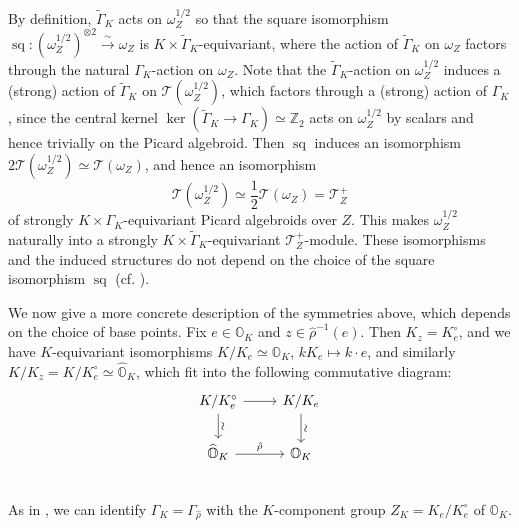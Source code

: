 \documentclass[11pt, a4paper]{amsart}
\newcommand*{\isoarrow}[1]{\arrow[#1,"\rotatebox{90}{\(\sim\)}"]}
\newcommand{\orb}{\mathbb{O}}
\newcommand{\orbk}{\orb_{K}}
\newcommand{\horbk}{\widehat{\orb}_{K}}
\newcommand{\Z}{\mathbb{Z}}
\newcommand{\tGamma}{\widetilde{\Gamma}}
\DeclareMathOperator{\sq}{sq}
\newcommand{\smallhalf}{{\scriptscriptstyle 1/2}}
\newcommand{\TT}{\mathscr{T}}
\theoremstyle{definition}
\numberwithin{equation}{section}
\begin{document}
By definition, $\tGamma_K$ acts on $\omega_Z^{\smallhalf}$ so that the square isomorphism $\sq: (\omega_Z^{\smallhalf})^{\otimes 2} \xrightarrow{\sim} \omega_Z$ is $K \times \tGamma_K$-equivariant, where the action of $\tGamma_K$ on $\omega_Z$ factors through the natural $\Gamma_K$-action on $\omega_Z$. Note that the $\tGamma_K$-action on $\omega_Z^{\smallhalf}$ induces a (strong) action of $\tGamma_K$ on $\TT(\omega_Z^{\smallhalf})$, which factors through a (strong) action of $\Gamma_K$, since the central kernel $\ker(\tGamma_K \to \Gamma_K) \simeq \Z_2$ acts on $\omega_Z^{\smallhalf}$ by scalars and hence trivially on the Picard algebroid. Then $\sq$ induces an isomorphism $2 \TT(\omega_Z^{\smallhalf}) \simeq \TT(\omega_Z)$, and hence an isomorphism 
\begin{equation} \label{eq:isom_T}
	\TT(\omega_Z^{\smallhalf}) \simeq \frac{1}{2}\TT(\omega_Z) = \TT^+_Z 
\end{equation} 
of strongly $K \times \Gamma_K$-equivariant Picard algebroids over $Z$. 
This makes $\omega_Z^{\smallhalf}$ naturally into a strongly $K \times \tGamma_K$-equivariant $\TT^+_Z$-module. These isomorphisms and the induced structures do not depend on the choice of the square isomorphism $\sq$ (cf. ).

We now give a more concrete description of the symmetries above, which depends on the choice of base points. 
Fix $e \in \orbk$ and $z \in \hat{\rho}^{-1}(e)$. Then $K_z = K_e^\circ$, and we have $K$-equivariant isomorphisms $K/K_e \simeq \orbk$, $k K_e \mapsto k \cdot e$, and similarly $K/K_z = K/K_e^\circ \simeq \horbk$, which fit into the following commutative diagram:
\begin{equation} \label{diag:cover_diagram}
	\begin{tikzcd}
		K/K_e^\circ \ar[r] \isoarrow{d} & K/K_e \isoarrow{d} \\
		\horbk \ar[r, "\hat{\rho}"]  & \orbk  \\
	\end{tikzcd}
\end{equation}
As in , we can identify $\Gamma_K = \Gamma_{\hat{\rho}}$ with the $K$-component group $Z_K = K_e / K_e^\circ$ of $\orbk$.
\end{document}
